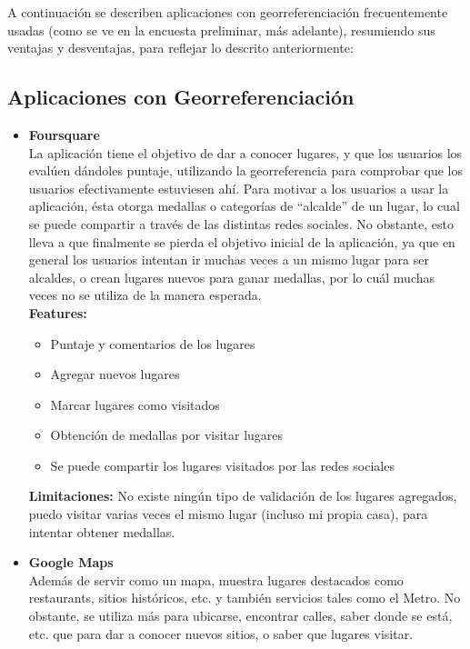 \documentclass[10pt,letterpaper]{article}
\begin{document}
A continuación se describen aplicaciones con georreferenciación frecuentemente usadas (como se ve en la encuesta preliminar, más adelante), resumiendo sus ventajas y desventajas, para reflejar lo descrito anteriormente:\\

\subsection{Aplicaciones con Georreferenciación}

\begin{itemize}
 
\item \textbf{Foursquare}\\

La aplicación tiene el objetivo de dar a conocer lugares, y que los usuarios los evalúen dándoles puntaje, utilizando la georreferencia para comprobar que los usuarios efectivamente estuviesen ahí. Para motivar a los usuarios a usar la aplicación, ésta otorga medallas o categorías de “alcalde” de un lugar, lo cual se puede compartir a través de las distintas redes sociales. No obstante, esto lleva a que finalmente se pierda el objetivo inicial de la aplicación, ya que en general los usuarios intentan ir muchas veces a un mismo lugar para ser alcaldes, o crean lugares nuevos para ganar medallas, por lo cuál muchas veces no se utiliza de la manera esperada.\\

\textbf{Features:}\\
\begin{itemize}
\item Puntaje y comentarios de los lugares
\item Agregar nuevos lugares
\item Marcar lugares como visitados
\item Obtención de medallas por visitar lugares
\item Se puede compartir los lugares visitados por las redes sociales
\end{itemize}

\textbf{Limitaciones:} No existe ningún tipo de validación de los lugares agregados, puedo visitar varias veces el mismo lugar (incluso mi propia casa), para intentar obtener medallas.

\item \textbf{Google Maps}\\

Además de servir como un mapa, muestra lugares destacados como restaurants, sitios históricos, etc. y también servicios tales como el Metro. No obstante, se utiliza más para ubicarse, encontrar calles, saber donde se está, etc. que para dar a conocer nuevos sitios, o saber que lugares visitar.\\


\end{itemize}
\end{document}
